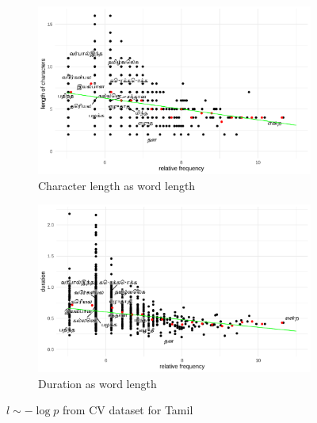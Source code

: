 \begin{figure}[H]
  \centering
  \begin{subfigure}[b]{0.48\textwidth}
    \centering
    \includegraphics[width=\textwidth]{plots/Tamil_logp_cl_CV.pdf}
    \caption{Character length as word length}
  \end{subfigure}
  \hfill
  \begin{subfigure}[b]{0.48\textwidth}
    \centering
    \includegraphics[width=\textwidth]{plots/Tamil_logp_d_CV.pdf}
    \caption{Duration as word length}
  \end{subfigure}
  \caption{$l \sim -\log p$ from CV dataset for Tamil}
\end{figure}

